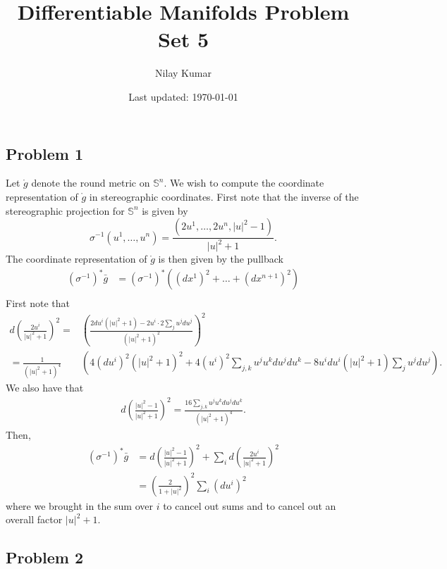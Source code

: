 \documentclass{../../mathnotes}
\title{Differentiable Manifolds Problem Set 5}
\author{Nilay Kumar}
\date{Last updated: \today}
\begin{document}
\maketitle

\subsection*{Problem 1}

Let $\mathring{g}$ denote the round metric on $\mathbb{S}^n$. We wish to compute the coordinate representation of
$\mathring{g}$ in stereographic coordinates. First note that the inverse of the stereographic projection for $\mathbb{S}^n$
is given by
\[\sigma^{-1}(u^1,\ldots,u^n)=\frac{(2u^1,\ldots,2u^n,|u|^2-1)}{|u|^2+1}.\]
The coordinate representation of $\mathring{g}$ is then given by the pullback
\begin{align*}
    (\sigma^{-1})^*\bar g&=(\sigma^{-1})^*\left( (dx^1)^2+\ldots+(dx^{n+1})^2\right)\\
\end{align*}
First note that
\begin{align*}
    d\left( \frac{2u^i}{|u|^2+1} \right)^2=&\left(  \frac{2du^i(|u|^2+1)-2u^i\cdot2\sum_ju^jdu^j}{(|u|^2+1)^2}\right)^2\\
    =\frac{1}{(|u|^2+1)^4}&\left(4(du^i)^2(|u|^2+1)^2+4(u^i)^2\sum_{j,k}u^ju^kdu^jdu^k-8u^idu^i(|u|^2+1)\sum_ju^jdu^j \right).
\end{align*}
We also have that
\begin{align*}
    d\left( \frac{|u|^2-1}{|u|^2+1} \right)^2=\frac{16\sum_{j,k}u^ju^kdu^jdu^k}{(|u|^2+1)^4}.
\end{align*}
Then,
\begin{align*}
    (\sigma^{-1})^*\bar g&=d\left( \frac{|u|^2-1}{|u|^2+1} \right)^2+\sum_i d\left( \frac{2u^i}{|u|^2+1} \right)^2\\
    &=\left( \frac{2}{1+|u|^2} \right)^2\sum_i (du^i)^2
\end{align*}
where we brought in the sum over $i$ to cancel out sums and to cancel out an overall factor $|u|^2+1$.


\subsection*{Problem 2}
\end{document}
